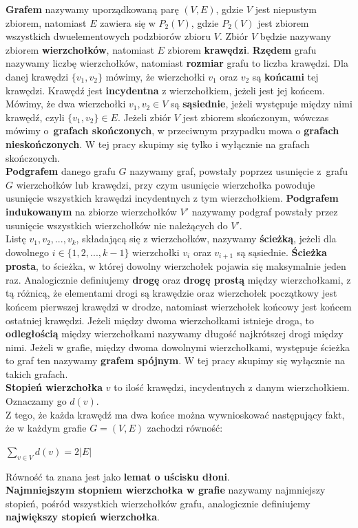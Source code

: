 \documentclass[12pt,a4paper,titlepage]{article}
\newcommand\tab[1][1cm]{\hspace*{#1}}
\begin{document}
\textbf{Grafem} nazywamy uporządkowaną parę $(V, E)$, gdzie $V$ jest niepustym zbiorem, natomiast $E$ zawiera się w  $P_2 (V)$, gdzie $P_2(V)$ jest zbiorem wszystkich dwuelementowych podzbiorów zbioru $V$. Zbiór $V$ będzie nazywany zbiorem \textbf{wierzchołków}, natomiast $E$ zbiorem \textbf{krawędzi}. \textbf{Rzędem} grafu nazywamy liczbę wierzchołków, natomiast \textbf{rozmiar} grafu to liczba krawędzi. Dla danej krawędzi $\{v_1 , v_2 \}$ mówimy, że wierzchołki $v_1$ oraz $v_2$ są \textbf{końcami} tej krawędzi. Krawędź jest \textbf{incydentna} z wierzchołkiem, jeżeli jest jej końcem. Mówimy, że dwa wierzchołki $v_1, v_2 \in V$ są \textbf{sąsiednie}, jeżeli występuje między nimi krawędź, czyli $\{v_1, v_2\} \in E$.
Jeżeli zbiór $V$ jest zbiorem skończonym, wówczas mówimy o~\textbf{grafach skończonych}, w przeciwnym przypadku mowa o \textbf{grafach nieskończonych}. W tej pracy skupimy się tylko i wyłącznie na grafach skończonych.\\
\tab[0.6cm]\textbf{Podgrafem} danego grafu $G$ nazywamy graf, powstały poprzez usunięcie z~grafu $G$ wierzchołków lub krawędzi, przy czym usunięcie wierzchołka powoduje usunięcie wszystkich krawędzi incydentnych z tym wierzchołkiem. \textbf{Podgrafem indukowanym} na zbiorze wierzchołków $V'$ nazywamy podgraf powstały przez usunięcie wszystkich wierzchołków nie należących do $V'$. \\
\tab[0.6cm]Listę $v_1, v_2, ..., v_k$, składającą się z wierzchołków, nazywamy \textbf{ścieżką}, jeżeli dla dowolnego $i \in \{1,2,..., k-1\} $ wierzchołki $v_i$ oraz $v_{i+1}$ są sąsiednie. \textbf{Ścieżka prosta}, to ścieżka, w której dowolny wierzchołek pojawia się maksymalnie jeden raz. Analogicznie definiujemy \textbf{drogę} oraz \textbf{drogę prostą} między wierzchołkami, z tą różnicą, że elementami drogi są krawędzie oraz wierzchołek początkowy jest końcem pierwszej krawędzi w drodze, natomiast wierzchołek końcowy jest końcem ostatniej krawędzi.
Jeżeli między dwoma wierzchołkami istnieje droga, to \textbf{odległością} między wierzchołkami nazywamy długość najkrótszej drogi między nimi. Jeżeli w grafie, między dwoma dowolnymi wierzchołkami, występuje ścieżka to graf ten nazywamy \textbf{grafem spójnym}. W tej pracy skupimy się wyłącznie na takich grafach.\\
\tab[0.6cm]\textbf{Stopień wierzchołka} $v$ to ilość krawędzi, incydentnych z danym wierzchołkiem. Oznaczamy go $d(v)$. \\
\tab[0.6cm]Z tego, że każda krawędź ma dwa końce można wywnioskować następujący fakt, że w każdym grafie $G=(V,E)$ zachodzi równość:
\begin{center}$\sum_{v \in V}d(v) = 2|E|$ \end{center}
Równość ta znana jest jako \textbf{lemat o uścisku dłoni}.\\
\tab[0.6cm]\textbf{Najmniejszym stopniem wierzchołka w grafie} nazywamy najmniejszy stopień, pośród wszystkich wierzchołków grafu, analogicznie definiujemy \textbf{największy stopień wierzchołka}. \\
\end{document}
